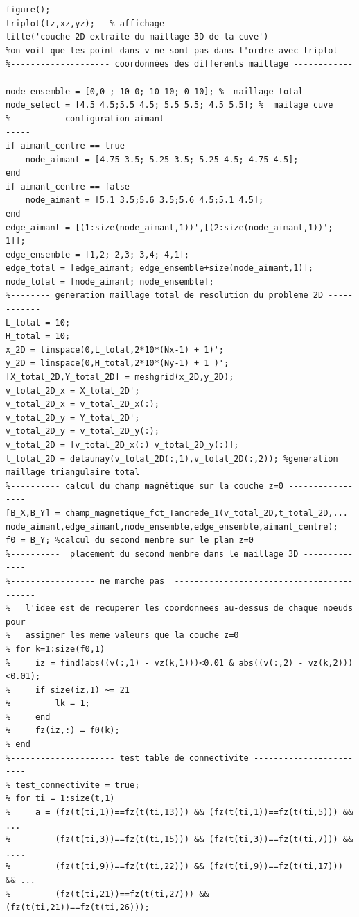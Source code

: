 \documentclass[a4paper,12pt,titlepage]{report}
\begin{document}
\begin{onehalfspace}
\begin{appendix}
\begin{verbatim}
figure();
triplot(tz,xz,yz);   % affichage
title('couche 2D extraite du maillage 3D de la cuve')
%on voit que les point dans v ne sont pas dans l'ordre avec triplot         
%-------------------- coordonnées des differents maillage ------------------
node_ensemble = [0,0 ; 10 0; 10 10; 0 10]; %  maillage total
node_select = [4.5 4.5;5.5 4.5; 5.5 5.5; 4.5 5.5]; %  mailage cuve 
%---------- configuration aimant ------------------------------------------
if aimant_centre == true
    node_aimant = [4.75 3.5; 5.25 3.5; 5.25 4.5; 4.75 4.5]; 
end
if aimant_centre == false
    node_aimant = [5.1 3.5;5.6 3.5;5.6 4.5;5.1 4.5];       
end
edge_aimant = [(1:size(node_aimant,1))',[(2:size(node_aimant,1))'; 1]];       
edge_ensemble = [1,2; 2,3; 3,4; 4,1];                               
edge_total = [edge_aimant; edge_ensemble+size(node_aimant,1)];       
node_total = [node_aimant; node_ensemble];                      
%-------- generation maillage total de resolution du probleme 2D ------------
L_total = 10;
H_total = 10;
x_2D = linspace(0,L_total,2*10*(Nx-1) + 1)';
y_2D = linspace(0,H_total,2*10*(Ny-1) + 1 )';
[X_total_2D,Y_total_2D] = meshgrid(x_2D,y_2D);
v_total_2D_x = X_total_2D';
v_total_2D_x = v_total_2D_x(:);
v_total_2D_y = Y_total_2D';
v_total_2D_y = v_total_2D_y(:);
v_total_2D = [v_total_2D_x(:) v_total_2D_y(:)];
t_total_2D = delaunay(v_total_2D(:,1),v_total_2D(:,2)); %generation maillage triangulaire total
%---------- calcul du champ magnétique sur la couche z=0 ----------------- 
[B_X,B_Y] = champ_magnetique_fct_Tancrede_1(v_total_2D,t_total_2D,...
node_aimant,edge_aimant,node_ensemble,edge_ensemble,aimant_centre);
f0 = B_Y; %calcul du second menbre sur le plan z=0
%----------  placement du second menbre dans le maillage 3D --------------
%----------------- ne marche pas  ------------------------------------------
%   l'idee est de recuperer les coordonnees au-dessus de chaque noeuds pour
%   assigner les meme valeurs que la couche z=0
% for k=1:size(f0,1)
%     iz = find(abs((v(:,1) - vz(k,1)))<0.01 & abs((v(:,2) - vz(k,2)))<0.01);
%     if size(iz,1) ~= 21
%         lk = 1;
%     end
%     fz(iz,:) = f0(k);                                     
% end
%--------------------- test table de connectivite ------------------------
% test_connectivite = true;
% for ti = 1:size(t,1)
%     a = (fz(t(ti,1))==fz(t(ti,13))) && (fz(t(ti,1))==fz(t(ti,5))) && ...
%         (fz(t(ti,3))==fz(t(ti,15))) && (fz(t(ti,3))==fz(t(ti,7))) && ....
%         (fz(t(ti,9))==fz(t(ti,22))) && (fz(t(ti,9))==fz(t(ti,17))) && ...
%         (fz(t(ti,21))==fz(t(ti,27))) && (fz(t(ti,21))==fz(t(ti,26)));

\end{verbatim}
\end{appendix}
\end{onehalfspace}
\end{document}
